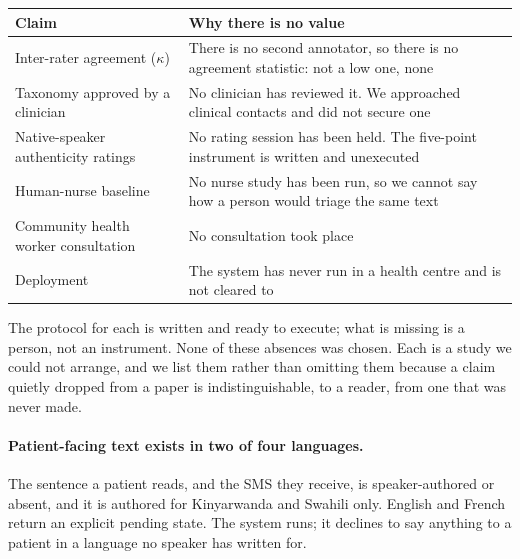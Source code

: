 %
\begin{center}
\footnotesize
\setlength{\tabcolsep}{4pt}
\begin{tabular}{>{\raggedright\arraybackslash}p{2.4cm}>{\raggedright\arraybackslash}p{4.6cm}}
\toprule
Claim & Why there is no value \\
\midrule
Inter-rater agreement ($\kappa$) & There is no second annotator, so there is no
agreement statistic: not a low one, none \\
Taxonomy approved by a clinician & No clinician has reviewed it. We approached
clinical contacts and did not secure one \\
Native-speaker authenticity ratings & No rating session has been held. The
five-point instrument is written and unexecuted \\
Human-nurse baseline & No nurse study has been run, so we cannot say how a
person would triage the same text \\
Community health worker consultation & No consultation took place \\
Deployment & The system has never run in a health centre and is not cleared to \\
\bottomrule
\end{tabular}
\end{center}

The protocol for each is written and ready to execute; what is missing is a
person, not an instrument. None of these absences was chosen. Each is a study we
could not arrange, and we list them rather than omitting them because a claim
quietly dropped from a paper is indistinguishable, to a reader, from one that was
never made.

\paragraph{Patient-facing text exists in two of four languages.} The sentence a
patient reads, and the SMS they receive, is speaker-authored or absent,
and it is authored for Kinyarwanda and Swahili only. English and French return
an explicit pending state. The system runs; it declines to say anything to a
patient in a language no speaker has written for.

